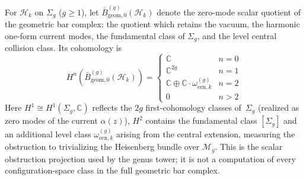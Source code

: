 \begin{theorem}\label{thm:heisenberg-higher-genus}
For $\mathcal{H}_k$ on $\Sigma_g$ ($g \geq 1$), let
$\bar{B}_{\mathrm{geom},0}^{(g)}(\mathcal H_k)$ denote the
zero-mode scalar quotient of the geometric bar complex: the quotient
which retains the vacuum, the harmonic one-form current modes, the
fundamental class of $\Sigma_g$, and the level central collision
class. Its cohomology is
\[
H^n(\bar{B}_{\mathrm{geom},0}^{(g)}(\mathcal{H}_k)) = \begin{cases}
\mathbb{C} & n = 0 \\
\mathbb{C}^{2g} & n = 1 \\
\mathbb{C} \oplus \mathbb{C} \cdot \omega_{\mathrm{cen},k}^{(g)} & n = 2 \\
0 & n > 2
\end{cases}
\]
Here $H^1 \cong H^1(\Sigma_g, \mathbb{C})$ reflects the $2g$ first-cohomology classes of~$\Sigma_g$ (realized as zero modes of the current $\alpha(z)$), $H^2$ contains the fundamental class $[\Sigma_g]$ and an additional level class $\omega_{\mathrm{cen},k}^{(g)}$ arising from the central extension, measuring the obstruction to trivializing the Heisenberg bundle over $\mathcal{M}_g$.
This is the scalar obstruction projection used by the genus tower; it
is not a computation of every configuration-space class in the full
geometric bar complex.
\end{theorem}

